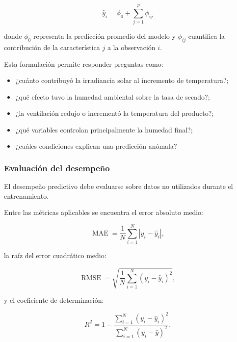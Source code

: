 \begin{equation}
\boxed{
\hat{y}_i
=
\phi_0
+
\sum_{j=1}^{p}
\phi_{ij}
}
\end{equation}

donde $\phi_0$ representa la predicción promedio del modelo y $\phi_{ij}$ cuantifica la contribución de la característica $j$ a la observación $i$.

Esta formulación permite responder preguntas como:

\begin{itemize}
    \item ¿cuánto contribuyó la irradiancia solar al incremento de temperatura?;
    \item ¿qué efecto tuvo la humedad ambiental sobre la tasa de secado?;
    \item ¿la ventilación redujo o incrementó la temperatura del producto?;
    \item ¿qué variables controlan principalmente la humedad final?;
    \item ¿cuáles condiciones explican una predicción anómala?
\end{itemize}

\subsubsection{Evaluación del desempeño}

El desempeño predictivo debe evaluarse sobre datos no utilizados durante el entrenamiento.

Entre las métricas aplicables se encuentra el error absoluto medio:

\begin{equation}
\operatorname{MAE}
=
\frac{1}{N}
\sum_{i=1}^{N}
\left|
y_i-\hat{y}_i
\right|,
\end{equation}

la raíz del error cuadrático medio:

\begin{equation}
\operatorname{RMSE}
=
\sqrt{
\frac{1}{N}
\sum_{i=1}^{N}
\left(
y_i-\hat{y}_i
\right)^2
},
\end{equation}

y el coeficiente de determinación:

\begin{equation}
R^2
=
1-
\frac{
\sum_{i=1}^{N}
\left(
y_i-\hat{y}_i
\right)^2
}{
\sum_{i=1}^{N}
\left(
y_i-\bar{y}
\right)^2
}.
\end{equation}

